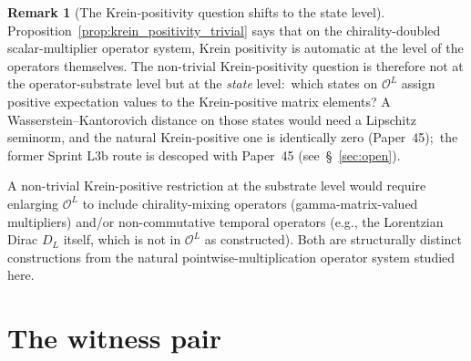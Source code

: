 \documentclass[11pt,a4paper]{article}
\theoremstyle{plain}
\theoremstyle{definition}
\newtheorem{remark}[theorem]{Remark}
\newcommand{\Op}{\mathcal{O}}
\newcommand{\DL}{D_L}
\begin{document}
\begin{remark}[The Krein-positivity question shifts to the state level]
\label{rem:state_level}
Proposition~\ref{prop:krein_positivity_trivial} says that on the
chirality-doubled scalar-multiplier operator system, Krein
positivity is automatic at the level of the operators themselves.
The non-trivial Krein-positivity question is therefore not at the
operator-substrate level but at the \emph{state} level:\ which states
on $\Op^L$ assign positive expectation values to the Krein-positive
matrix elements?  A Wasserstein--Kantorovich distance on those states
would need a Lipschitz seminorm, and the natural Krein-positive one is
identically zero (Paper~45);\ the former Sprint L3b route is descoped
with Paper~45 (see~\S~\ref{sec:open}).

A non-trivial Krein-positive restriction at the substrate level would
require enlarging $\Op^L$ to include chirality-mixing operators
(gamma-matrix-valued multipliers) and/or non-commutative temporal
operators (e.g., the Lorentzian Dirac $\DL$ itself, which is not in
$\Op^L$ as constructed). Both are structurally distinct constructions
from the natural pointwise-multiplication operator system studied
here.
\end{remark}

\section{The witness pair}\label{sec:witness}
\end{document}
